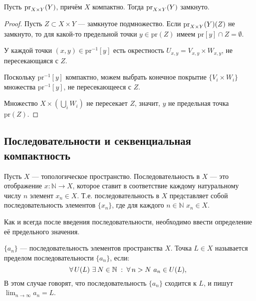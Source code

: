 \begin{statement}
    Пусть \(\mathrm{pr}_{X \times Y}(Y)\), причём \(X\) компактно. Тогда \(\mathrm{pr}_{X \times Y}(Y)\) замкнуто.
\end{statement}

\begin{proof}
    Пусть \(Z \subset X \times Y\) — замкнутое подмножество. Если \(\mathrm{pr}_{X \times Y}(Y)(Z)\) не замкнуто, то для какой-то предельной точки \(y \in \mathrm{pr}(Z)\) имеем \(\mathrm{pr}[y] \cap Z = \emptyset\).

    У каждой точки \((x, y) \in \mathrm{pr}^{-1}[y]\) есть окрестность \(U_{x, y} = V_{x, y} \times W_{x, y}\), не пересекающаяся с \(Z\).

    Поскольку \(\mathrm{pr}^{-1}[y]\) компактно, можем выбрать конечное покрытие \(\{V_i \times W_i\}\) множества \(\mathrm{pr}^{-1}[y]\), не пересекающееся с \(Z\).

    Множество \(\displaystyle X \times (\bigcup_i W_i)\) не пересекает \(Z\), значит, \(y\) не предельная точка \(\mathrm{pr}(Z)\).
\end{proof}

\subsection{Последовательности и секвенциальная компактность}

\begin{definition}
	Пусть \( X \) — топологическое пространство. Последовательность в \( X \) — это отображение \( x: \mathbb{N} \to X \), которое ставит в соответствие каждому натуральному числу \( n \) элемент \( x_n \in X \). Т.е. последовательность в \( X \) представляет собой последовательность элементов \( \{x_n\} \), где для каждого \( n \in \mathbb{N} \) \( x_n \in X \).
\end{definition}
Как и всегда после введения последовательности, необходимо ввести определение её предельного значения. 
\begin{definition}
	\( \{a_n\} \) — последовательность элементов пространства \( X \). Точка \( L \in X \) называется пределом последовательности \( \{a_n\} \), если:
	\[
		\forall U(L) \ \exists N \in \mathbb{N}\st \forall n > N \ a_n \in U(L),
	\]
	В этом случае говорят, что последовательность \( \{a_n\} \) сходится к \( L \), и пишут \(\displaystyle \lim_{n \to \infty} a_n = L \).
\end{definition}

